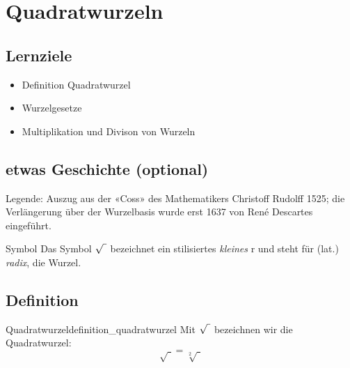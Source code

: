
\section{Quadratwurzeln}\index{$\sqrt{\mathstrut{}\,}$}

\subsection*{Lernziele}

\begin{itemize}
\item Definition Quadratwurzel
\item Wurzelgesetze
\item Multiplikation und Divison von Wurzeln
\end{itemize}


\newpage
\subsection*{etwas Geschichte (optional)}

\noTRAINER{\vspace{50mm}}



Legende: 
Auszug aus der «Coss» des Mathematikers Christoff
Rudolff 1525; die
Verlängerung über der Wurzelbasis wurde erst 1637 von René Descartes eingeführt.


\begin{bemerkung}{Symbol}{}
Das Symbol $\sqrt{\vphantom{b} \,\,}$
bezeichnet ein stilisiertes {\textit{kleines}} {\huge{r}} und steht für
  (lat.) \textit{radix}, die Wurzel.
\end{bemerkung}

\newpage

\subsection{Definition}
\begin{definition}{Quadratwurzel}{definition_quadratwurzel}
Mit $\sqrt{\vphantom{b} \,\,}$ bezeichnen wir die
Quadratwurzel:
$$\sqrt{\,\,}  = \sqrt[2]{\,\,}$$
\end{definition}


